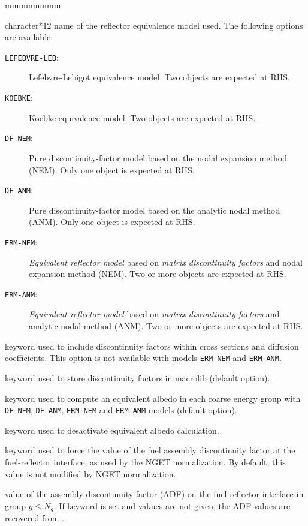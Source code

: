 \begin{ListeDeDescription}{mmmmmmmm}
\item[\dusa{hmod}] character*12 name of the reflector equivalence model used. The following options are available:
\begin{description}
\item[{\tt LEFEBVRE-LEB}:] Lefebvre-Lebigot equivalence model. Two  objects are expected at RHS.\cite{LLB,Frohlicher}
\item[{\tt KOEBKE}:] Koebke equivalence model. Two  objects are expected at RHS.\cite{Koebke,Frohlicher}
\item[{\tt DF-NEM}:] Pure discontinuity-factor model based on the nodal expansion method (NEM). Only one  object is expected at RHS.
\item[{\tt DF-ANM}:] Pure discontinuity-factor model based on the analytic nodal method (ANM). Only one  object is expected at RHS.
\item[{\tt ERM-NEM}:] {\sl Equivalent reflector model} based on {\sl matrix discontinuity factors} and nodal expansion method (NEM).
Two or more  objects are expected at RHS.
\item[{\tt ERM-ANM}:] {\sl Equivalent reflector model} based on {\sl matrix discontinuity factors} and analytic nodal method (ANM).
Two or more  objects are expected at RHS.
\end{description}

\item[\moc{SPH}] keyword used to include discontinuity factors within cross sections and diffusion coefficients. This option is not available
with models {\tt ERM-NEM} and {\tt ERM-ANM}.

\item[\moc{NOSP}] keyword used to store discontinuity factors in {\sc macrolib}  (default option).

\item[\moc{ALBE}] keyword used to compute an equivalent albedo in each coarse energy group with {\tt DF-NEM}, {\tt DF-ANM}, {\tt ERM-NEM} and {\tt ERM-ANM} models (default option).

\item[\moc{NOAL}] keyword used to desactivate equivalent albedo calculation.

\item[\moc{NGET}] keyword used to force the value of the fuel assembly discontinuity factor at the fuel-reflector interface, as used
by the NGET normalization. By default, this value is not modified by NGET normalization.

\item[\dusa{adf}] value of the assembly discontinuity factor (ADF) on the fuel-reflector interface in group $g\le N_g$. If keyword  is set and
 vakues are not given, the ADF values are recovered from .

\end{ListeDeDescription}

\eject
